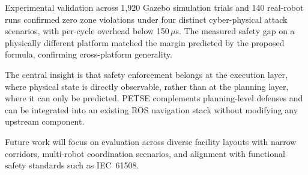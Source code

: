 \documentclass[journal,twoside,web]{ieeecolor}
\begin{document}
Experimental validation across 1{,}920 Gazebo simulation trials and 140 real-robot runs confirmed zero zone violations under four distinct cyber-physical attack scenarios, with per-cycle overhead below 150\,$\mu$s. The measured safety gap on a physically different platform matched the margin predicted by the proposed formula, confirming cross-platform generality.

The central insight is that safety enforcement belongs at the execution layer, where physical state is directly observable, rather than at the planning layer, where it can only be predicted. PETSE complements planning-level defenses and can be integrated into an existing ROS navigation stack without modifying any upstream component.

Future work will focus on evaluation across diverse facility layouts with narrow corridors, multi-robot coordination scenarios, and alignment with functional safety standards such as IEC~61508.



\end{document}

